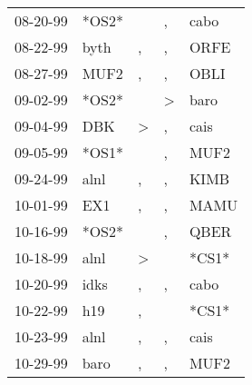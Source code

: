 \begin{supertabular}{p{0.07\textwidth}p{0.06\textwidth}p{0.02\textwidth}p{0.02\textwidth}p{0.06\textwidth}}
          08-20-99\textsuperscript{} &                            *OS2* &                  &                , &           cabo\textsuperscript{} \\
          08-22-99\textsuperscript{} &           byth\textsuperscript{} &                , &                , &           ORFE\textsuperscript{} \\
          08-27-99\textsuperscript{} &           MUF2\textsuperscript{} &                , &                , &           OBLI\textsuperscript{} \\
          09-02-99\textsuperscript{} &                            *OS2* &                  &     \textgreater &           baro\textsuperscript{} \\
          09-04-99\textsuperscript{} &            DBK\textsuperscript{} &     \textgreater &                , &           cais\textsuperscript{} \\
          09-05-99\textsuperscript{} &                            *OS1* &                  &                , &           MUF2\textsuperscript{} \\
          09-24-99\textsuperscript{} &           alnl\textsuperscript{} &                , &                , &           KIMB\textsuperscript{} \\
          10-01-99\textsuperscript{} &            EX1\textsuperscript{} &                , &                , &           MAMU\textsuperscript{} \\
          10-16-99\textsuperscript{} &                            *OS2* &                  &                , &           QBER\textsuperscript{} \\
          10-18-99\textsuperscript{} &           alnl\textsuperscript{} &     \textgreater &                  &                            *CS1* \\
          10-20-99\textsuperscript{} &           idks\textsuperscript{} &                , &                , &           cabo\textsuperscript{} \\
          10-22-99\textsuperscript{} &            h19\textsuperscript{} &                , &                  &                            *CS1* \\
          10-23-99\textsuperscript{} &           alnl\textsuperscript{} &                , &                , &           cais\textsuperscript{} \\
          10-29-99\textsuperscript{} &           baro\textsuperscript{} &                , &                , &           MUF2\textsuperscript{} \\

\end{supertabular}
